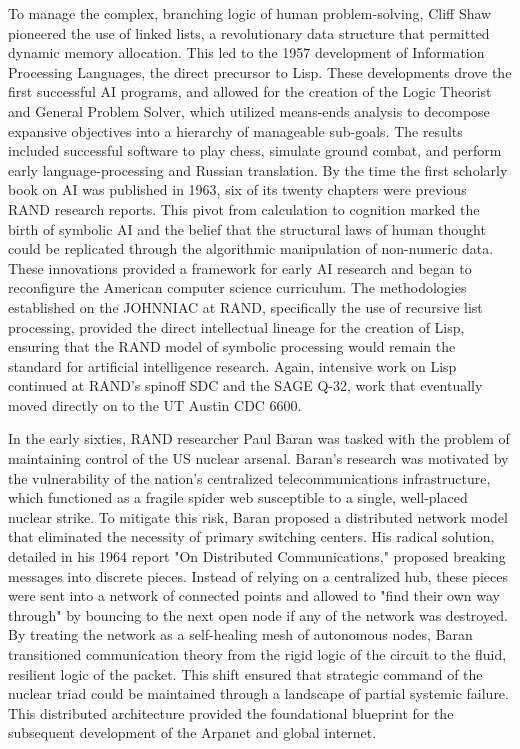 To manage the complex, branching logic of human problem-solving, Cliff Shaw pioneered the use of linked lists, a revolutionary data structure that permitted dynamic memory allocation. This led to the 1957 development of Information Processing Languages, the direct precursor to Lisp. These developments drove the first successful AI programs, and allowed for the creation of the Logic Theorist and General Problem Solver, which utilized means-ends analysis to decompose expansive objectives into a hierarchy of manageable sub-goals. The results included successful software to play chess, simulate ground combat, and perform early language-processing and Russian translation. By the time the first scholarly book on AI was published in 1963, six of its twenty chapters were previous RAND research reports. This pivot from calculation to cognition marked the birth of symbolic AI and the belief that the structural laws of human thought could be replicated through the algorithmic manipulation of non-numeric data. These innovations provided a framework for early AI research and began to reconfigure the American computer science curriculum. The methodologies established on the JOHNNIAC at RAND, specifically the use of recursive list processing, provided the direct intellectual lineage for the creation of Lisp, ensuring that the RAND model of symbolic processing would remain the standard for artificial intelligence research. Again, intensive work on Lisp continued at RAND’s spinoff SDC and the SAGE Q-32, work that eventually moved directly on to the UT Austin CDC 6600. 

In the early sixties, RAND researcher Paul Baran was tasked with the problem of maintaining control of the US nuclear arsenal. Baran’s research was motivated by the vulnerability of the nation’s centralized telecommunications infrastructure, which functioned as a fragile spider web susceptible to a single, well-placed nuclear strike. To mitigate this risk, Baran proposed a distributed network model that eliminated the necessity of primary switching centers. His radical solution, detailed in his 1964 report "On Distributed Communications," proposed breaking messages into discrete pieces. Instead of relying on a centralized hub, these pieces were sent into a network of connected points and allowed to "find their own way through" by bouncing to the next open node if any of the network was destroyed. By treating the network as a self-healing mesh of autonomous nodes, Baran transitioned communication theory from the rigid logic of the circuit to the fluid, resilient logic of the packet. This shift ensured that strategic command of the nuclear triad could be maintained through a landscape of partial systemic failure. This distributed architecture provided the foundational blueprint for the subsequent development of the Arpanet and global internet. 


